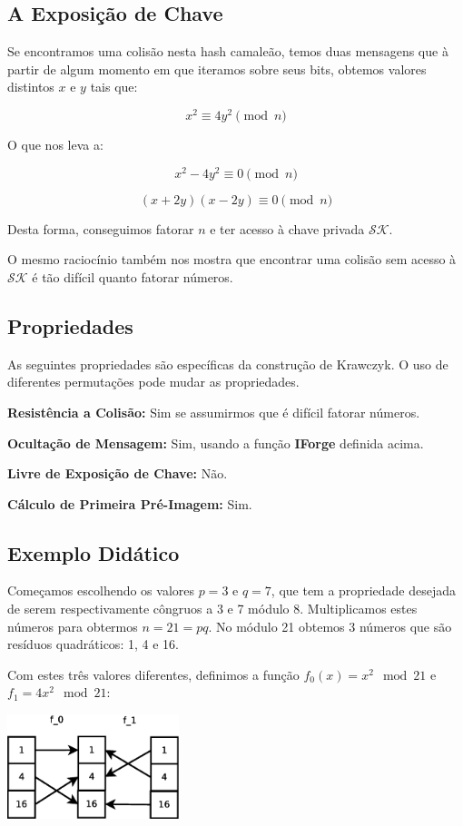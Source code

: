 \documentclass[a4paper]{article}
\begin{document}
\subsection{A Exposição de Chave}

Se encontramos uma colisão nesta hash camaleão, temos duas mensagens
que à partir de algum momento em que iteramos sobre seus bits, obtemos
valores distintos $x$ e $y$ tais que:

$$
x^2 \equiv 4y^2 \pmod n
$$

O que nos leva a:

$$
x^2 - 4y^2 \equiv 0 \pmod n
$$

$$
(x+2y)(x-2y) \equiv 0 \pmod n
$$

Desta forma, conseguimos fatorar $n$ e ter acesso à chave privada
$\mathcal{SK}$.

O mesmo raciocínio também nos mostra que encontrar uma colisão sem
acesso à $\mathcal{SK}$ é tão difícil quanto fatorar números.

\subsection{Propriedades}

As seguintes propriedades são específicas da construção de Krawczyk. O
uso de diferentes permutações pode mudar as propriedades.

\textbf{Resistência a Colisão: }Sim se assumirmos que é difícil
fatorar números.

\textbf{Ocultação de Mensagem: }Sim, usando a função \textbf{IForge}
definida acima.

\textbf{Livre de Exposição de Chave: } Não.
  
\textbf{Cálculo de Primeira Pré-Imagem: }Sim.

\subsection{Exemplo Didático}

Começamos escolhendo os valores $p=3$ e $q=7$, que tem a propriedade
desejada de serem respectivamente côngruos a 3 e 7 módulo
8. Multiplicamos estes números para obtermos $n = 21 = pq$. No módulo
21 obtemos 3 números que são resíduos quadráticos: 1, 4 e 16.

Com estes três valores diferentes, definimos a função $f_0(x)=x^2\mod
21$ e $f_1=4x^2\mod 21$:

\includegraphics[width=5cm]{imagens/toy1.eps}
\end{document}
